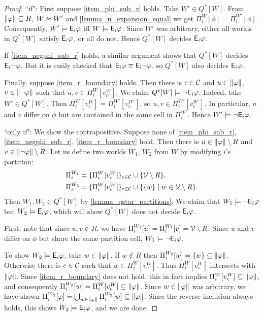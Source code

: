 \begin{proof}

    ``if": First suppose \cref{item_phi_sub_r} holds. Take $W' \in Q^*[W]$.
    From $\|{\varphi}\| \subseteq R$, $W \approx W'$ and
    \cref{lemma_u_expansion_equal} we get $\Pi^W_i[\phi] = \Pi^{W'}_i[\phi]$.
    Consequently, $W' \models \mathsf{E}_i\varphi$ iff $W \models \mathsf{E}_i\varphi$. Since $W'$
    was arbitrary, either all worlds in $Q^*[W]$ satisfy $\mathsf{E}_i\varphi$, or all do
    not. Hence $Q^*[W]$ decides $\mathsf{E}_i\varphi$.

    If \cref{item_negphi_sub_r} holds, a similar argument shows that $Q^*[W]$
    decides $\mathsf{E}_i\neg\varphi$. But it is easily checked that $\mathsf{E}_i\varphi \equiv
    \mathsf{E}_i\neg\varphi$, so $Q^*[W]$ also decides $\mathsf{E}_i\varphi$.

    Finally, suppose \cref{item_r_boundary} holds. Then there is $c \in \mathcal{C}$
    and $u \in \|{\varphi}\|$, $v \in \|{\neg\varphi}\|$ such that $u, v
    \in \Pi^W_i[v^W_c]$. We claim $Q^*[W] \models \neg\mathsf{E}_i\varphi$. Indeed, take
    $W' \in Q^*[W]$. Then $\Pi^W_i[v^W_c] = \Pi^{W'}_i[v^{W'}_c]$, so $u, v \in
    \Pi^{W'}_i[v^{W'}_c]$. In particular, $u$ and $v$ differ on $\phi$ but are
    contained in the same cell in $\Pi^{W'}_i$. Hence $W' \models
    \neg\mathsf{E}_i\varphi$.

    ``only if": We show the contrapositive. Suppose none of
    \cref{item_phi_sub_r}, \cref{item_negphi_sub_r}, \cref{item_r_boundary}
    hold. Then there is $u \in \|{\varphi}\| \setminus R$ and $v \in
    \|{\neg\varphi}\| \setminus R$. Let us define two worlds $W_1$, $W_2$
    from $W$ by modifying $i$'s partition:
    \begin{align*}
        \Pi^{W_1}_i
            &= \{\Pi^W_i[v^W_c]\}_{c \in \mathcal{C}} \cup \{\mathcal{V} \setminus R \}, \\
        \Pi^{W_2}_i
            &= \{\Pi^W_i[v^W_c]\}_{c \in \mathcal{C}} \cup \{\{w\} \mid w \in \mathcal{V}
                    \setminus R\}.
    \end{align*}
    Then $W_1, W_2 \in Q^*[W]$ by \cref{lemma_qstar_partitions}. We claim that
    $W_1 \models \neg\mathsf{E}_i\varphi$ but $W_2 \models \mathsf{E}_i\varphi$, which will show
    $Q^*[W]$ does not decide $\mathsf{E}_i\varphi$.

    First, note that since $u, v \notin R$, we have $\Pi^{W_1}_i[u] =
    \Pi^{W_1}_i[v] = \mathcal{V} \setminus R$. Since $u$ and $v$ differ on $\phi$ but
    share the same partition cell, $W_1 \models \neg\mathsf{E}_i\varphi$.

    To show $W_2 \models \mathsf{E}_i\varphi$, take $w \in \|{\varphi}\|$. If $w \notin
    R$ then $\Pi^{W_2}_i[w] = \{w\} \subseteq \|{\varphi}\|$. Otherwise there
    is $c \in \mathcal{C}$ such that $w \in \Pi^W_i[v^W_c]$. Thus $\Pi^W_i[v^W_c]$
    intersects with $\|{\varphi}\|$. Since \cref{item_r_boundary} does not
    hold, this in fact implies $\Pi^W_i[v^W_c] \subseteq \|{\varphi}\|$, and
    consequently $\Pi^{W_2}_i[w] = \Pi^W_i[v^W_c] \subseteq \|{\varphi}\|$.
    Since $w \in \|{\varphi}\|$ was arbitrary, we have shown
    $\Pi^{W_2}_i[\varphi] = \bigcup_{w \in \|{\varphi}\|}{\Pi^{W_2}_i[w]}
    \subseteq \|{\varphi}\|$. Since the reverse inclusion always holds, this
    shows $W_2 \models \mathsf{E}_i\varphi$, and we are done.
\end{proof}

